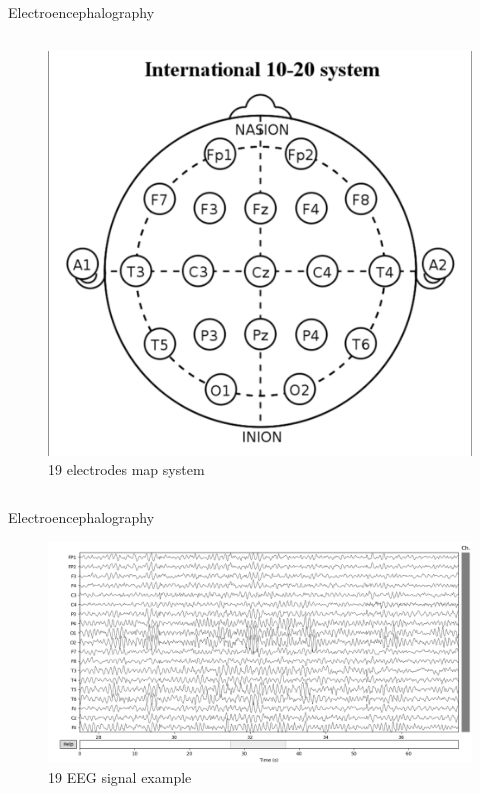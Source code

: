 \documentclass[xcolor=dvipsnames]{beamer} %
\begin{document}
\begin{frame}{Electroencephalography}
\begin{columns}
\begin{column}{0.5\textwidth}
\begin{figure}
                \includegraphics[scale=0.55]{images/EEG_electrodes_map_19.png}
                \caption{19 electrodes map system}
                \label{fig:19}
            \end{figure}
        \end{column}
        \end{columns}
    \end{frame}
    
    \begin{frame}{Electroencephalography}
        \begin{figure}
            \centering
            \includegraphics[scale = 0.25]{images/EEG_with_MNE.png}
            \caption{19 EEG signal example}
            \label{fig:fulldisplay}
        \end{figure}
    \end{frame}
    
\end{document}
